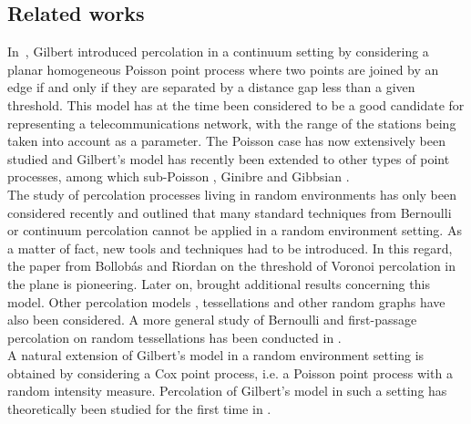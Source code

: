 \documentclass[10pt,a4paper]{amsart}
\theoremstyle{exampstyle}
\theoremstyle{exampnotations}
\begin{document}
\subsection{Related works}
\label{Ss.Relatedworks}
In~\cite{gilbert1961random}, Gilbert introduced percolation in a continuum setting by considering a planar homogeneous Poisson point process where two points are joined by an edge if and only if they are separated by a distance gap less than a given threshold. %
This model has at the time been considered to be a good candidate for representing a telecommunications network, with the range of the stations being taken into account as a parameter. The Poisson case has now extensively been studied \cite{FnT1,meester_continuum_1996} and Gilbert's model has recently been extended to other types of point processes, among which sub-Poisson \cite{blaszczyszyn2010connectivity,blaszczyszyn2013clustering,blaszczyszyn2015clustering} , Ginibre \cite{ghosh2016continuum} and Gibbsian \cite{jansen2016continuum,stucki2013continuum}. 
\\ \indent The study of percolation processes living in random environments has only been considered recently and outlined that many standard techniques from Bernoulli or continuum percolation cannot be applied in a random environment setting.
As a matter of fact, new tools and techniques had to be introduced. In this regard, the paper from Bollob\'as and Riordan \cite{bollobas2006critical} on the threshold of Voronoi percolation in the plane is pioneering. Later on, \cite{ahlberg2016quenched,tassion2016crossing} brought additional results concerning this model. Other percolation models \cite{vahidi1990first}, tessellations \cite{bollobas2008percolation} and other random graphs \cite{balister2008percolationknearest, balister2008percolation, beringer2017percolation} have also been considered. A more general study of Bernoulli and first-passage percolation on random tessellations has been conducted in \cite{ziesche2016bernoulli,ziesche2016first}. 
\\ \indent A natural extension of Gilbert's model in a random environment setting is obtained by considering a Cox point process, i.e. a Poisson point process with a random intensity measure. Percolation of Gilbert's model in such a setting has theoretically been studied for the first time in \cite{hirsch2018continuum}. %
\end{document}
